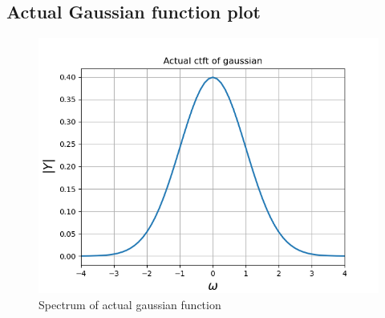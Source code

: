 \documentclass[11pt]{article}
\begin{document}
\subsection{Actual Gaussian function plot}
\begin{figure}[H]
    \centering
    \includegraphics[scale = 0.75]{Figure_7c.png}
    \caption{Spectrum of actual gaussian function}
\end{figure}
\end{document}
